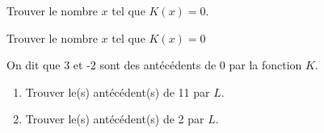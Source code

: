 \begin{frame}
    \vspace*{1em}

    Trouver le nombre $x$ tel que $K(x)=0$. 
\end{frame}

\begin{frame}
    \vspace*{1em}

    Trouver le nombre $x$ tel que $K(x)=0$ \vspace*{1em}

    On dit que 3 et -2 sont des antécédents de 0 par la fonction $K$.
\end{frame}

\begin{frame}
    \vspace*{1em}

    \begin{enumerate}
        \item Trouver le(s) antécédent(s) de 11 par $L$.
        \item Trouver le(s) antécédent(s) de 2 par $L$.
    \end{enumerate}
\end{frame}